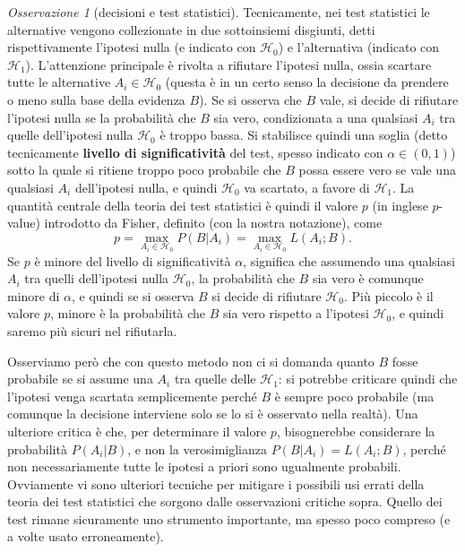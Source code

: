 \documentclass[
  italian,
  letterpaper,
]{book}
\theoremstyle{definition}
\theoremstyle{remark}
\newtheorem*{remark}{Osservazione}
\begin{document}
\begin{remark}[decisioni e test statistici]
Tecnicamente, nei test statistici le alternative vengono collezionate in
due sottoinsiemi disgiunti, detti rispettivamente l'ipotesi nulla (e
indicato con \(\mathcal{H}_0\)) e l'alternativa (indicato con
\(\mathcal{H}_1\)). L'attenzione principale è rivolta a rifiutare
l'ipotesi nulla, ossia scartare tutte le alternative
\(A_i \in \mathcal{H}_0\) (questa è in un certo senso la decisione da
prendere o meno sulla base della evidenza \(B\)). Se si osserva che
\(B\) vale, si decide di rifiutare l'ipotesi nulla se la probabilità che
\(B\) sia vero, condizionata a una qualsiasi \(A_i\) tra quelle
dell'ipotesi nulla \(\mathcal{H}_0\) è troppo bassa. Si stabilisce
quindi una soglia (detto tecnicamente \textbf{livello di
significatività} del test, spesso indicato con \(\alpha \in (0,1)\))
sotto la quale si ritiene troppo poco probabile che \(B\) possa essere
vero se vale una qualsiasi \(A_i\) dell'ipotesi nulla, e quindi
\(\mathcal{H}_0\) va scartato, a favore di \(\mathcal{H}_1\). La
quantità centrale della teoria dei test statistici è quindi il valore
\(p\) (in inglese \(p\)-value) introdotto da Fisher, definito (con la
nostra notazione), come
\[ p = \max_{A_i \in \mathcal{H}_0} P(B | A_i) = \max_{A_i \in \mathcal{H}_0} L(A_i; B).\]
Se \(p\) è minore del livello di significatività \(\alpha\), significa
che assumendo una qualsiasi \(A_i\) tra quelli dell'ipotesi nulla
\(\mathcal{H}_0\), la probabilità che \(B\) sia vero è comunque minore
di \(\alpha\), e quindi se si osserva \(B\) si decide di rifiutare
\(\mathcal{H}_0\). Più piccolo è il valore \(p\), minore è la
probabilità che \(B\) sia vero rispetto a l'ipotesi \(\mathcal{H}_0\), e
quindi saremo più sicuri nel rifiutarla.

Osserviamo però che con questo metodo non ci si domanda quanto \(B\)
fosse probabile se si assume una \(A_i\) tra quelle delle
\(\mathcal{H}_1\): si potrebbe criticare quindi che l'ipotesi venga
scartata semplicemente perché \(B\) è sempre poco probabile (ma comunque
la decisione interviene solo se lo si è osservato nella realtà). Una
ulteriore critica è che, per determinare il valore \(p\), bisognerebbe
considerare la probabilità \(P(A_i |B)\), e non la verosimiglianza
\(P(B|A_i) = L(A_i; B)\), perché non necessariamente tutte le ipotesi a
priori sono ugualmente probabili. Ovviamente vi sono ulteriori tecniche
per mitigare i possibili usi errati della teoria dei test statistici che
sorgono dalle osservazioni critiche sopra. Quello dei test rimane
sicuramente uno strumento importante, ma spesso poco compreso (e a volte
usato erroneamente).
\end{remark}
\end{document}
